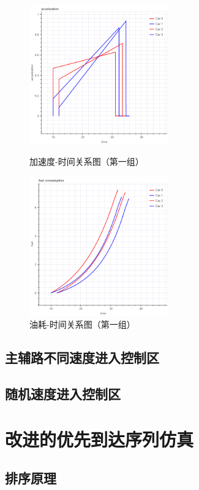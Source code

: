 \begin{figure}
\begin{minipage}{0.48\textwidth}
  \centering
  \includegraphics[height=6cm]{figures/sim_case1/acc.png}
  \caption{加速度-时间关系图（第一组）}
  \label{fig:case1:acc}
\end{minipage}\hfill
\begin{minipage}{0.48\textwidth}
  \centering
  \includegraphics[height=6cm]{figures/sim_case1/fuel.png}
  \caption{油耗-时间关系图（第一组）}
  \label{fig:case1:fuel}
\end{minipage}
\end{figure}

\subsection{主辅路不同速度进入控制区}
\subsection{随机速度进入控制区}

\section{改进的优先到达序列仿真}
\subsection{排序原理}
